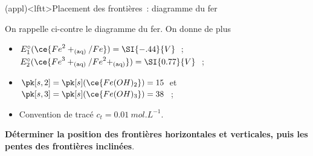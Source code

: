 \documentclass[../../main/main.tex]{subfiles}
\begin{document}
\begin{tcb*}[breakable](appl)<lftt>{Placement des frontières~: diagramme du fer}
  \noindent
  \begin{minipage}[c]{.67\linewidth}
    On rappelle ci-contre le diagramme du fer. On donne de plus
    \begin{itemize}
      \item $E_1^\circ(\ce{{Fe}^2+_{\rm(aq)}/Fe}) = \SI{-.44}{V}$~;
        $E_2^\circ(\ce{{Fe}^3+_{\rm(aq)}/{Fe}^2+_{\rm(aq)}}) = \SI{0.77}{V}$~;
      \item $\pk[s,2] = \pk[s](\ce{Fe(OH)_2}) = 15$ et $\pk[s,3] =
        \pk[s](\ce{Fe(OH)_3}) = 38$~;
      \item Convention de tracé $c_t = \SI{0.01}{mol.L^{-1}}$.
    \end{itemize}
    \textbf{Déterminer la position des frontières horizontales et verticales,
    puis les pentes des frontières inclinées}.
  \end{minipage}
  \begin{minipage}[c]{.30\linewidth}
    \vspace{0pt}
    \begin{center}
\end{center}
\end{minipage}
\end{tcb*}
\end{document}
